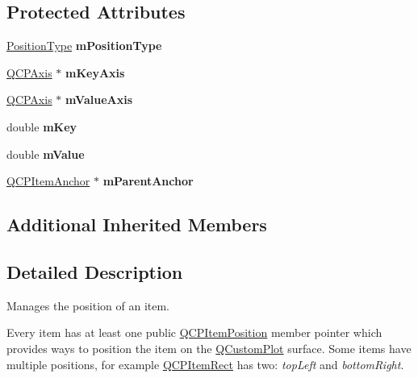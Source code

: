 \subsection*{Protected Attributes}
\begin{DoxyCompactItemize}
\item 
\hypertarget{classQCPItemPosition_ac9c7bbca809601323d3ae2542ef2801a}{\hyperlink{classQCPItemPosition_aad9936c22bf43e3d358552f6e86dbdc8}{Position\-Type} {\bfseries m\-Position\-Type}}\label{classQCPItemPosition_ac9c7bbca809601323d3ae2542ef2801a}

\item 
\hypertarget{classQCPItemPosition_a05b13a027fd0b07663fd70b8ab1c8842}{\hyperlink{classQCPAxis}{Q\-C\-P\-Axis} $\ast$ {\bfseries m\-Key\-Axis}}\label{classQCPItemPosition_a05b13a027fd0b07663fd70b8ab1c8842}

\item 
\hypertarget{classQCPItemPosition_acd281f6bd352758ff00d852f1f0fa06f}{\hyperlink{classQCPAxis}{Q\-C\-P\-Axis} $\ast$ {\bfseries m\-Value\-Axis}}\label{classQCPItemPosition_acd281f6bd352758ff00d852f1f0fa06f}

\item 
\hypertarget{classQCPItemPosition_a4ff3931ad115603dfb4c7000b24bb415}{double {\bfseries m\-Key}}\label{classQCPItemPosition_a4ff3931ad115603dfb4c7000b24bb415}

\item 
\hypertarget{classQCPItemPosition_a67bf5df69f587d53731724a7d61c6c3f}{double {\bfseries m\-Value}}\label{classQCPItemPosition_a67bf5df69f587d53731724a7d61c6c3f}

\item 
\hypertarget{classQCPItemPosition_a21e37c5a8cabe747a2c60773b23eddeb}{\hyperlink{classQCPItemAnchor}{Q\-C\-P\-Item\-Anchor} $\ast$ {\bfseries m\-Parent\-Anchor}}\label{classQCPItemPosition_a21e37c5a8cabe747a2c60773b23eddeb}

\end{DoxyCompactItemize}
\subsection*{Additional Inherited Members}


\subsection{Detailed Description}
Manages the position of an item. 

Every item has at least one public \hyperlink{classQCPItemPosition}{Q\-C\-P\-Item\-Position} member pointer which provides ways to position the item on the \hyperlink{classQCustomPlot}{Q\-Custom\-Plot} surface. Some items have multiple positions, for example \hyperlink{classQCPItemRect}{Q\-C\-P\-Item\-Rect} has two\-: {\itshape top\-Left} and {\itshape bottom\-Right}.

